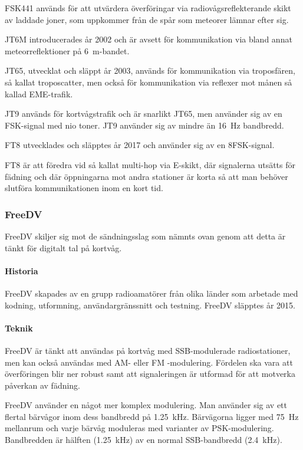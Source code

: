 FSK441 används för att utvärdera överföringar via radiovågsreflekterande skikt
av laddade joner, som uppkommer från de spår som meteorer lämnar efter sig.

JT6M introducerades år 2002 och är avsett för kommunikation via bland annat
meteorreflektioner på \SI{6}{\metre}-bandet.

JT65, utvecklat och släppt år 2003, används för kommunikation via troposfären,
så kallat troposcatter, men också för kommunikation via reflexer mot månen
så kallad EME-trafik.

JT9 används för kortvågstrafik och är snarlikt JT65, men använder sig av en
FSK-signal med nio toner.
JT9 använder sig av mindre än \SI{16}{\hertz} bandbredd.

FT8 utvecklades och släpptes år 2017 och använder sig av en 8FSK-signal.

FT8 är att föredra vid så kallat multi-hop via E-skikt, där signalerna utsätts för
fädning och där öppningarna mot andra stationer är korta så att man behöver
slutföra kommunikationen inom en kort tid.

\subsubsection{FreeDV}

FreeDV skiljer sig mot de sändningsslag som nämnts ovan genom att detta är tänkt
för digitalt tal på kortvåg.

\paragraph{Historia}

FreeDV skapades av en grupp radioamatörer från olika länder som arbetade
med kodning, utformning, användargränssnitt och testning.
FreeDV släpptes år 2015.

\paragraph{Teknik}

FreeDV är tänkt att användas på kortvåg med SSB-modulerade radiostationer,
men kan också användas med AM- eller FM -modulering.
Fördelen ska vara att överföringen blir ner robust samt att signaleringen är
utformad för att motverka påverkan av fädning.

FreeDV använder en något mer komplex modulering.
Man använder sig av ett flertal bärvågor inom dess bandbredd på
\SI{1,25}{\kilo\hertz}.
Bärvägorna ligger med \SI{75}{\hertz} mellanrum och varje bärvåg moduleras med
varianter av PSK-modulering.
Bandbredden är hälften (\SI{1,25}{\kilo\hertz}) av en normal SSB-bandbredd
(\SI{2,4}{\kilo\hertz}).

